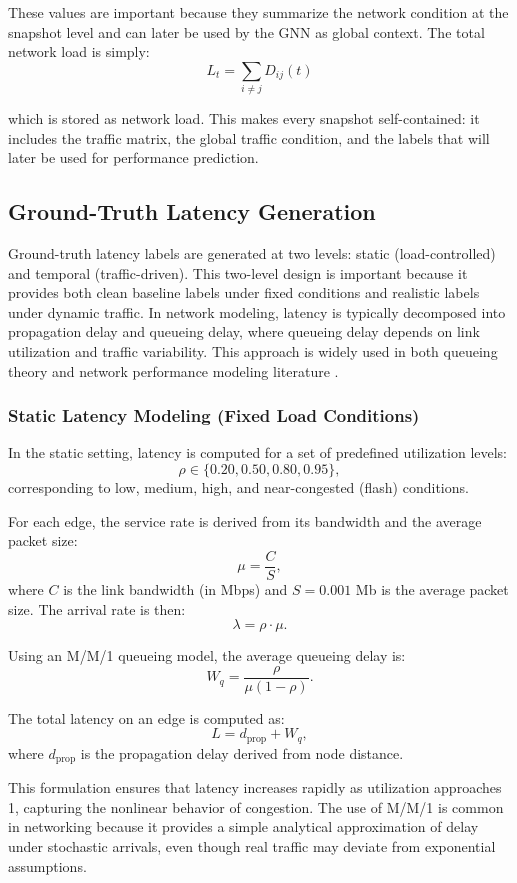 \documentclass[12pt]{article}
\begin{document}
These values are important because they summarize the network condition at the snapshot level and can later be used by the GNN as global context. The total network load is simply:
\[
L_t = \sum_{i \neq j} D_{ij}(t)
\]

which is stored as network load. This makes every snapshot self-contained: it includes the traffic matrix, the global traffic condition, and the labels that will later be used for performance prediction.

\subsection{Ground-Truth Latency Generation}
Ground-truth latency labels are generated at two levels: static (load-controlled) and temporal (traffic-driven). This two-level design is important because it provides both clean baseline labels under fixed conditions and realistic labels under dynamic traffic. In network modeling, latency is typically decomposed into propagation delay and queueing delay, where queueing delay depends on link utilization and traffic variability. This approach is widely used in both queueing theory and network performance modeling literature \cite{queueDelay}.

\subsubsection{Static Latency Modeling (Fixed Load Conditions)}

In the static setting, latency is computed for a set of predefined utilization levels:
\[
\rho \in \{0.20, 0.50, 0.80, 0.95\},
\]
corresponding to low, medium, high, and near-congested (flash) conditions.

For each edge, the service rate is derived from its bandwidth and the average packet size:
\[
\mu = \frac{C}{S},
\]
where $C$ is the link bandwidth (in Mbps) and $S = 0.001$ Mb is the average packet size. The arrival rate is then:
\[
\lambda = \rho \cdot \mu.
\]

Using an M/M/1 queueing model, the average queueing delay is:
\[
W_q = \frac{\rho}{\mu (1 - \rho)}.
\]

The total latency on an edge is computed as:
\[
L = d_{\text{prop}} + W_q,
\]
where $d_{\text{prop}}$ is the propagation delay derived from node distance.

This formulation ensures that latency increases rapidly as utilization approaches 1, capturing the nonlinear behavior of congestion. The use of M/M/1 is common in networking because it provides a simple analytical approximation of delay under stochastic arrivals, even though real traffic may deviate from exponential assumptions.
\end{document}
